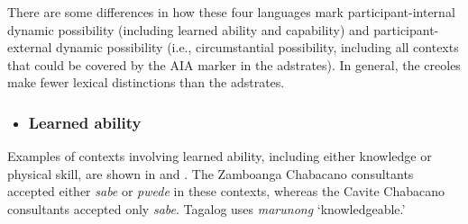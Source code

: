 \documentclass[output=paper]{langsci/langscibook}
\begin{document}
There are some differences in how these four languages mark participant-internal dynamic possibility (including learned ability and capability) and participant-external dynamic possibility (i.e., circumstantial possibility, including all contexts that could be covered by the AIA marker in the adstrates). In general, the creoles make fewer lexical distinctions than the adstrates. 

\begin{itemize}
\item \subsubsection{Learned ability}
\end{itemize}

Examples of contexts involving learned ability, including either knowledge or physical skill, are shown in  and . The Zamboanga Chabacano consultants accepted either \textit{sabe} or \textit{pwede} in these contexts, whereas the Cavite Chabacano consultants accepted only \textit{sabe}. Tagalog uses \textit{marunong} ‘knowledgeable.’ 

{}\\
\end{document}
